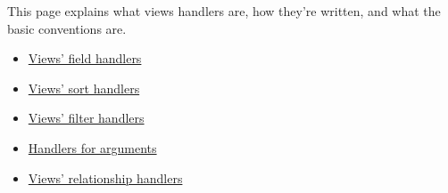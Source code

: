 This page explains what views handlers are, how they're written, and what the basic conventions are.

\begin{itemize}
\item \hyperlink{group__views__field__handlers}{Views' field handlers}\item \hyperlink{group__views__sort__handlers}{Views' sort handlers}\item \hyperlink{group__views__filter__handlers}{Views' filter handlers}\item \hyperlink{group__views__argument__handlers}{Handlers for arguments}\item \hyperlink{group__views__relationship__handlers}{Views' relationship handlers} \end{itemize}
